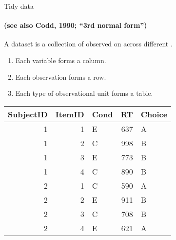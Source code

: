\documentclass[presentation]{beamer}
\begin{document}
\begin{frame}[label={sec:org92ee0de}]{Tidy data}
\framesubtitle{(see also Codd, 1990; ``3rd normal form'')}

A dataset is a collection of  observed on
 across different .

\begin{definition}
\begin{enumerate}
\item Each variable forms a column.
\item Each observation forms a row.
\item Each type of observational unit forms a table.
\end{enumerate}
\end{definition}

\begin{scriptsize}

\begin{center}
\begin{tabular}{rrlrl}
\hline
SubjectID & ItemID & Cond & RT & Choice\\
\hline
1 & 1 & E & 637 & A\\
1 & 2 & C & 998 & B\\
1 & 3 & E & 773 & B\\
1 & 4 & C & 890 & B\\
2 & 1 & C & 590 & A\\
2 & 2 & E & 911 & B\\
2 & 3 & C & 708 & B\\
2 & 4 & E & 621 & A\\
\hline
\end{tabular}
\end{center}

\end{scriptsize}
\end{frame}
\end{document}
